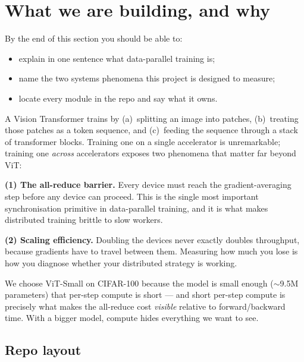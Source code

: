 \documentclass[11pt,a4paper]{article}
\begin{document}
\section{What we are building, and why}

\begin{objectives}
By the end of this section you should be able to:
\begin{itemize}[leftmargin=*, itemsep=1pt]
    \item explain in one sentence what data-parallel training is;
    \item name the two systems phenomena this project is designed to measure;
    \item locate every module in the repo and say what it owns.
\end{itemize}
\end{objectives}

A Vision Transformer trains by (a)~splitting an image into patches, (b)~treating those
patches as a token sequence, and (c)~feeding the sequence through a stack of transformer
blocks. Training one on a single accelerator is unremarkable; training one
\emph{across} accelerators exposes two phenomena that matter far beyond ViT:

\begin{keypoint}
\textbf{(1) The all-reduce barrier.} Every device must reach the gradient-averaging step
before any device can proceed. This is the single most important synchronisation primitive
in data-parallel training, and it is what makes distributed training brittle to slow workers.

\textbf{(2) Scaling efficiency.} Doubling the devices never exactly doubles throughput,
because gradients have to travel between them. Measuring how much you lose is how you
diagnose whether your distributed strategy is working.
\end{keypoint}

\noindent We choose ViT-Small on CIFAR-100 because the model is small enough
($\sim$9.5M parameters) that per-step compute is short --- and short per-step compute is
precisely what makes the all-reduce cost \emph{visible} relative to forward/backward time.
With a bigger model, compute hides everything we want to see.

\subsection{Repo layout}
\end{document}
